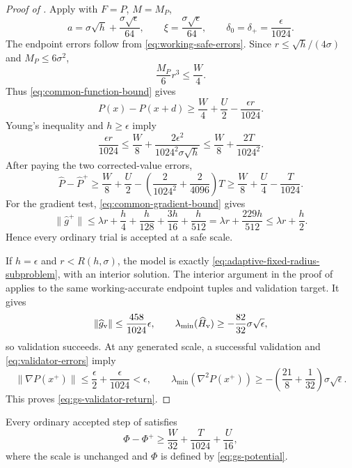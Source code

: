 \documentclass{article}
\begin{document}
\begin{proof}[Proof of ]
Apply  with $F=P$, $M=M_P$,
\[
 a=\sigma\sqrt h+\frac{\sigma\sqrt\epsilon}{64},
 \qquad
 \xi=\frac{\sigma\sqrt\epsilon}{64},
 \qquad
 \delta_0=\delta_+=\frac{\epsilon}{1024}.
\]
The endpoint errors follow from \eqref{eq:working-safe-errors}.
Since $r\le\sqrt h/(4\sigma)$ and $M_P\le6\sigma^2$,
\[
 \frac{M_P}{6}r^3\le\frac W4.
\]
Thus \eqref{eq:common-function-bound} gives
\[
 P(x)-P(x+d)\ge\frac W4+\frac U2-\frac{\epsilon r}{1024}.
\]
Young's inequality and $h\ge\epsilon$ imply
\[
 \frac{\epsilon r}{1024}
 \le\frac W8+
       \frac{2\epsilon^2}{1024^2\sigma\sqrt h}
 \le\frac W8+\frac{2T}{1024^2}.
\]
After paying the two corrected-value errors,
\[
 \widehat P-\widehat P^+
 \ge\frac W8+\frac U2
       -\left(\frac{2}{1024^2}+\frac{2}{4096}\right)T
 \ge\frac W8+\frac U4-\frac T{1024}.
\]
For the gradient test, \eqref{eq:common-gradient-bound} gives
\[
 \|\widehat g^+\|
 \le\lambda r+\frac h4+\frac h{128}
                    +\frac{3h}{16}+\frac h{512}
 =\lambda r+\frac{229h}{512}
 \le\lambda r+\frac h2.
\]
Hence every ordinary trial is accepted at a safe scale.

If $h=\epsilon$ and $r<R(h,\sigma)$, the model is exactly
\eqref{eq:adaptive-fixed-radius-subproblem}, with an interior
solution.  The interior argument in the proof of
 applies to the same
working-accurate endpoint tuples and validation target.  It gives
\[
 \|\widehat g_{\rm v}\|\le\frac{458}{1024}\epsilon,
 \qquad
 \lambda_{\min}(\widehat H_{\rm v})
 \ge-\frac{82}{32}\sigma\sqrt\epsilon,
\]
so validation succeeds.  At any generated scale, a successful
validation and \eqref{eq:validator-errors} imply
\[
 \|\nabla P(x^+)\|
 \le\frac\epsilon2+\frac\epsilon{1024}<\epsilon,
 \qquad
 \lambda_{\min}(\nabla^2P(x^+))
 \ge-\left(\frac{21}{8}+\frac1{32}\right)\sigma\sqrt\epsilon.
\]
This proves \eqref{eq:gs-validator-return}.
\end{proof}

\begin{lemma}
\label{lem:gs-descent}
Every ordinary accepted step of
 satisfies
\begin{equation}\label{eq:gs-potential-decrease}
 \Phi-\Phi^+\ge\frac W{32}+\frac T{1024}+\frac U{16},
\end{equation}
where the scale is unchanged and $\Phi$ is defined by
\eqref{eq:gs-potential}.
\end{lemma}
\end{document}
